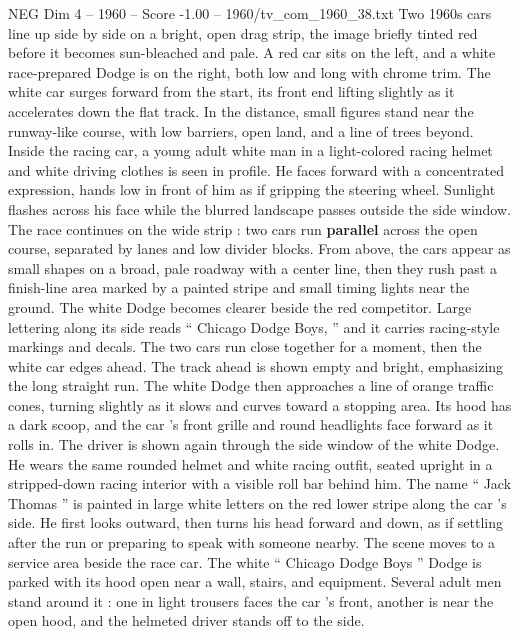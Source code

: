 \begin{textsample}{NEG Dim 4 – 1960 – Score -1.00 – 1960/tv\_com\_1960\_38.txt}  \label{ex:f4_neg_034}
Two 1960s cars line up side by side on a bright, open drag strip, the image briefly tinted red before it becomes sun-bleached and pale.
A red car sits on the left, and a white race-prepared Dodge is on the right, both low and long with chrome trim.
The white car surges forward from the start, its front end lifting slightly as it accelerates down the flat track.
In the distance, small figures stand near the runway-like course, with low barriers, open land, and a line of trees beyond.
Inside the racing car, a young adult white man in a light-colored racing helmet and white driving clothes is seen in profile.
He faces forward with a concentrated expression, hands low in front of him as if gripping the steering wheel.
Sunlight flashes across his face while the blurred landscape passes outside the side window.
The race continues on the wide strip : two cars run \textbf{parallel} across the open course, separated by lanes and low divider blocks.
From above, the cars appear as small shapes on a broad, pale roadway with a center line, then they rush past a finish-line area marked by a painted stripe and small timing lights near the ground.
The white Dodge becomes clearer beside the red competitor.
Large lettering along its side reads “ Chicago Dodge Boys, ” and it carries racing-style markings and decals.
The two cars run close together for a moment, then the white car edges ahead.
The track ahead is shown empty and bright, emphasizing the long straight run.
The white Dodge then approaches a line of orange traffic cones, turning slightly as it slows and curves toward a stopping area.
Its hood has a dark scoop, and the car ’s front grille and round headlights face forward as it rolls in.
The driver is shown again through the side window of the white Dodge.
He wears the same rounded helmet and white racing outfit, seated upright in a stripped-down racing interior with a visible roll bar behind him.
The name “ Jack Thomas ” is painted in large white letters on the red lower stripe along the car ’s side.
He first looks outward, then turns his head forward and down, as if settling after the run or preparing to speak with someone nearby.
The scene moves to a service area beside the race car.
The white “ Chicago Dodge Boys ” Dodge is parked with its hood open near a wall, stairs, and equipment.
Several adult men stand around it : one in light trousers faces the car ’s front, another is near the open hood, and the helmeted driver stands off to the side.

\end{textsample}
